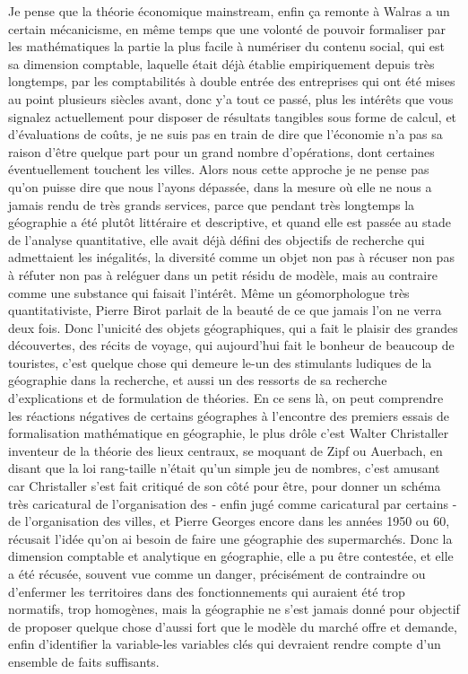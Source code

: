 \documentclass[12pt]{article}
\begin{document}
Je pense que la théorie économique mainstream, enfin ça remonte à Walras a un certain mécanicisme, en même temps que une volonté de pouvoir formaliser par les mathématiques la partie la plus facile à numériser du contenu social, qui est sa dimension comptable, laquelle était déjà établie empiriquement depuis très longtemps, par les comptabilités à double entrée des entreprises qui ont été mises au point plusieurs siècles avant, donc y'a tout ce passé, plus les intérêts que vous signalez actuellement pour disposer de résultats tangibles sous forme de calcul, et d'évaluations de coûts, je ne suis pas en train de dire que l'économie n'a pas sa raison d'être quelque part pour un grand nombre d'opérations, dont certaines éventuellement touchent les villes. Alors nous cette approche je ne pense pas qu'on puisse dire que nous l'ayons dépassée, dans la mesure où elle ne nous a jamais rendu de très grands services, parce que pendant très longtemps la géographie a été plutôt littéraire et descriptive, et quand elle est passée au stade de l'analyse quantitative, elle avait déjà défini des objectifs de recherche qui admettaient les inégalités, la diversité comme un objet non pas à récuser non pas à réfuter non pas à reléguer dans un petit résidu de modèle, mais au contraire comme une substance qui faisait l'intérêt. Même un géomorphologue très quantitativiste, Pierre Birot parlait de la beauté de ce que jamais l'on ne verra deux fois. Donc l'unicité des objets géographiques, qui a fait le plaisir des grandes découvertes, des récits de voyage, qui aujourd'hui fait le bonheur de beaucoup de touristes, c'est quelque chose qui demeure le-un des stimulants ludiques de la géographie dans la recherche, et aussi un des ressorts de sa recherche d'explications et de formulation de théories. En ce sens là, on peut comprendre les réactions négatives de certains géographes à l'encontre des premiers essais de formalisation mathématique en géographie, le plus drôle c'est Walter Christaller inventeur de la théorie des lieux centraux, se moquant de Zipf ou Auerbach, en disant que la loi rang-taille n'était qu'un simple jeu de nombres, c'est amusant car Christaller s'est fait critiqué de son côté pour être, pour donner un schéma très caricatural de l'organisation des - enfin jugé comme caricatural par certains - de l'organisation des villes, et Pierre Georges encore dans les années 1950 ou 60, récusait l'idée qu'on ai besoin de faire une géographie des supermarchés. Donc la dimension comptable et analytique en géographie, elle a pu être contestée, et elle a été récusée, souvent vue comme un danger, précisément de contraindre ou d'enfermer les territoires dans des fonctionnements qui auraient été trop normatifs, trop homogènes, mais la géographie ne s'est jamais donné pour objectif de proposer quelque chose d'aussi fort que le modèle du marché offre et demande, enfin d'identifier la variable-les variables clés qui devraient rendre compte d'un ensemble de faits suffisants.
\end{document}

